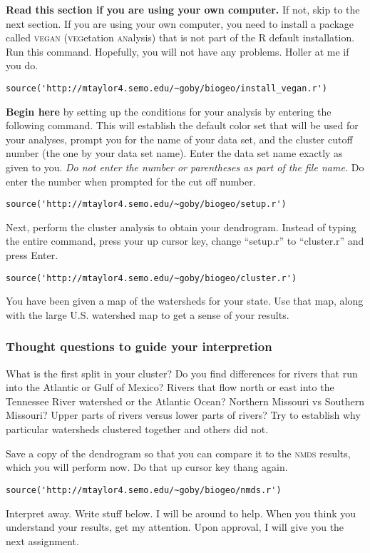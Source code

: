 \documentclass[11pt]{article}
\begin{document}
\textbf{Read this section if you are using your own computer.} If not, skip to the next section. 
If you are using your own computer, you need to install a package called \textsc{vegan} (\textsc{veg}etation
\textsc{an}alysis) that is not part of the R default installation. Run this command.  Hopefully, you will not have any problems. Holler at me if you do.

\begin{verbatim}
source('http://mtaylor4.semo.edu/~goby/biogeo/install_vegan.r')
\end{verbatim}

\textbf{Begin here} by setting up the conditions for your analysis by 
entering the following command.  This will establish the default color 
set that will be used for your analyses, prompt you for the name of your data set,
and the cluster cutoff number (the one by your data set name). Enter the data set
name exactly as given to you. \emph{Do not enter the number or parentheses as part of the file name.} 
Do enter the number when prompted for the cut off number.

\begin{verbatim}
source('http://mtaylor4.semo.edu/~goby/biogeo/setup.r')
\end{verbatim}

Next, perform the cluster analysis to obtain your dendrogram. Instead of typing the entire command,
press your up cursor key, change ``setup.r'' to ``cluster.r'' and press Enter.

\begin{verbatim}
source('http://mtaylor4.semo.edu/~goby/biogeo/cluster.r')
\end{verbatim}

You have been given a map of the watersheds for your state.  Use that map, along with the large U.S. watershed map to 
get a sense of your results. %

\subsubsection*{Thought questions to guide your interpretion}

What is the first split in your cluster? Do you find differences for rivers that run into the Atlantic or Gulf of Mexico? Rivers that flow north or east into the Tennessee River watershed or the Atlantic Ocean? Northern Missouri vs Southern Missouri?  Upper parts of rivers versus lower parts of rivers? Try to establish why particular watersheds clustered together and others did not.

Save a copy of the dendrogram so that you can compare it to the \textsc{nmds} results, which you will perform now.
Do that up cursor key thang again.

\begin{verbatim}
source('http://mtaylor4.semo.edu/~goby/biogeo/nmds.r')
\end{verbatim}

Interpret away. Write stuff below. I will be around to help. When you think you understand your results, get my attention. Upon approval, I will give you the next assignment.
\end{document}
